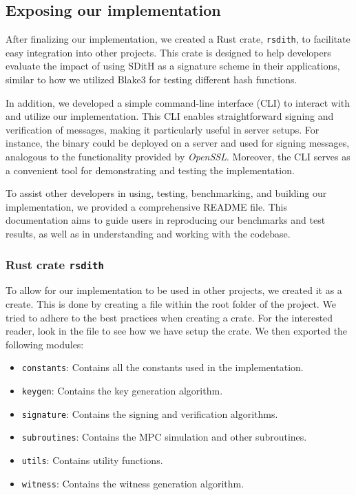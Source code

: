 \documentclass[11pt]{report}
\theoremstyle{definition}
\theoremstyle{plain}
\begin{document}
\subsection{Exposing our implementation}
After finalizing our implementation, we created a Rust crate, \texttt{rsdith}, to facilitate easy integration into other projects. This crate is designed to help developers evaluate the impact of using SDitH as a signature scheme in their applications, similar to how we utilized Blake3 for testing different hash functions.

In addition, we developed a simple command-line interface (CLI) to interact with and utilize our implementation. This CLI enables straightforward signing and verification of messages, making it particularly useful in server setups. For instance, the binary could be deployed on a server and used for signing messages, analogous to the functionality provided by \textit{OpenSSL}. Moreover, the CLI serves as a convenient tool for demonstrating and testing the implementation.

To assist other developers in using, testing, benchmarking, and building our implementation, we provided a comprehensive README file. This documentation aims to guide users in reproducing our benchmarks and test results, as well as in understanding and working with the codebase.

\subsubsection{Rust crate \texttt{rsdith}}
To allow for our implementation to be used in other projects, we created it as a create. This is done by creating a  file within the root folder of the project. We tried to adhere to the best practices when creating a crate. For the interested reader, look in the  file to see how we have setup the crate.
We then exported the following modules:
\begin{itemize}
  \item \texttt{constants}: Contains all the constants used in the implementation.
  \item \texttt{keygen}: Contains the key generation algorithm.
  \item \texttt{signature}: Contains the signing and verification algorithms.
  \item \texttt{subroutines}: Contains the MPC simulation and other subroutines.
  \item \texttt{utils}: Contains utility functions.
  \item \texttt{witness}: Contains the witness generation algorithm.
\end{itemize}
\end{document}
